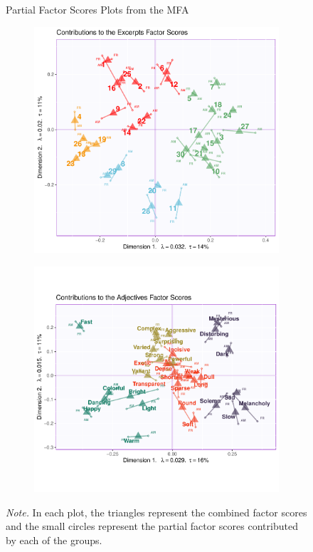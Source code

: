 \documentclass[
  english,
  man,floatsintext]{apa6}
\begin{document}
\begin{figure}
     \centering
     \caption{Partial Factor Scores Plots from the MFA}
     \begin{subfigure}[b]{0.49\textwidth}
         \centering
         \includegraphics[width=\textwidth]{./Music-Descriptor-Space_files/figure-latex/mfasbs-1}
         \label{fig:excerptspfs}
     \end{subfigure}
     \hfill
     \begin{subfigure}[b]{0.49\textwidth}
         \centering
         \includegraphics[width=\textwidth]{./Music-Descriptor-Space_files/figure-latex/mfasbs-2}
         \label{fig:adjectivespfs}
     \end{subfigure}
    \label{fig:mfasbs}
      \caption*{\footnotesize \textit{Note.}  In each plot, the triangles represent the combined factor scores and the small circles represent the partial factor scores contributed by each of the groups.}
\end{figure}
\end{document}
